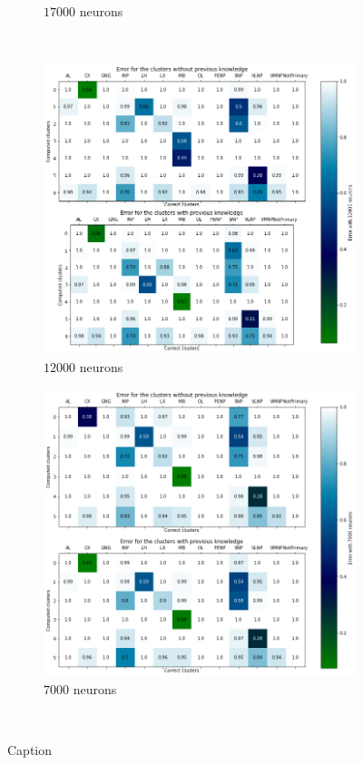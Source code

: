 \begin{figure}
\begin{subfigure}[b]{0.49\textwidth}
		\caption{$17000$ neurons}
	\end{subfigure}
	\\ \vspace{5mm}
	\centering
	\begin{subfigure}[b]{0.49\textwidth}
		\centering
		\includegraphics[width=\textwidth]{Images/Communities/Error_comm_12000.png}
		\caption{$12000$ neurons}
	\end{subfigure}
	\hfill
	\begin{subfigure}[b]{0.49\textwidth}
		\centering
		\includegraphics[width=\textwidth]{Images/Communities/Error_comm_7000.png}
		\caption{$7000$ neurons}
	\end{subfigure}
	\\ \vspace{5mm}
	\caption{Caption}
	\label{fig:cmaps}
\end{figure}